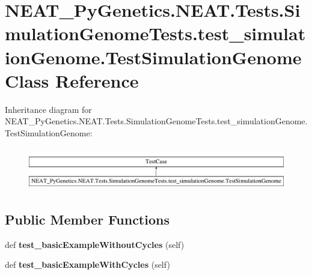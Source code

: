 \hypertarget{class_n_e_a_t___py_genetics_1_1_n_e_a_t_1_1_tests_1_1_simulation_genome_tests_1_1test__simulatioa0f878a251e2d1346bb30cc508043f47}{}\section{N\+E\+A\+T\+\_\+\+Py\+Genetics.\+N\+E\+A\+T.\+Tests.\+Simulation\+Genome\+Tests.\+test\+\_\+simulation\+Genome.\+Test\+Simulation\+Genome Class Reference}
\label{class_n_e_a_t___py_genetics_1_1_n_e_a_t_1_1_tests_1_1_simulation_genome_tests_1_1test__simulatioa0f878a251e2d1346bb30cc508043f47}
Inheritance diagram for N\+E\+A\+T\+\_\+\+Py\+Genetics.\+N\+E\+A\+T.\+Tests.\+Simulation\+Genome\+Tests.\+test\+\_\+simulation\+Genome.\+Test\+Simulation\+Genome\+:\begin{figure}[H]
\begin{center}
\leavevmode
\includegraphics[height=1.895093cm]{class_n_e_a_t___py_genetics_1_1_n_e_a_t_1_1_tests_1_1_simulation_genome_tests_1_1test__simulatioa0f878a251e2d1346bb30cc508043f47}
\end{center}
\end{figure}
\subsection*{Public Member Functions}
\begin{DoxyCompactItemize}
\item 
def {\bfseries test\+\_\+basic\+Example\+Without\+Cycles} (self)\hypertarget{class_n_e_a_t___py_genetics_1_1_n_e_a_t_1_1_tests_1_1_simulation_genome_tests_1_1test__simulatioa0f878a251e2d1346bb30cc508043f47_a184a01fe3c6ad018183362dba9be2fa1}{}\label{class_n_e_a_t___py_genetics_1_1_n_e_a_t_1_1_tests_1_1_simulation_genome_tests_1_1test__simulatioa0f878a251e2d1346bb30cc508043f47_a184a01fe3c6ad018183362dba9be2fa1}

\item 
def {\bfseries test\+\_\+basic\+Example\+With\+Cycles} (self)\hypertarget{class_n_e_a_t___py_genetics_1_1_n_e_a_t_1_1_tests_1_1_simulation_genome_tests_1_1test__simulatioa0f878a251e2d1346bb30cc508043f47_a184b06bada55fc6f36919253969e469b}{}\label{class_n_e_a_t___py_genetics_1_1_n_e_a_t_1_1_tests_1_1_simulation_genome_tests_1_1test__simulatioa0f878a251e2d1346bb30cc508043f47_a184b06bada55fc6f36919253969e469b}

\end{DoxyCompactItemize}


